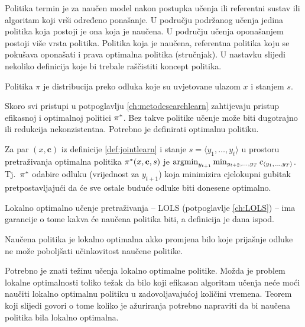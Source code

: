 Politika  termin je za naučen model nakon postupka učenja ili
referentni sustav ili algoritam koji vrši određeno ponašanje. U području
podržanog učenja jedina politika koja postoji je ona koja je naučena. U području
učenja oponašanjem  postoji više vrsta politika. Politika
koja je naučena, referentna politika koju se pokušava oponašati i prava optimalna
politika (stručnjak). U nastavku slijedi nekoliko definicija koje bi trebale
raščistiti koncept politika.

\begin{definition}[Politika]

  Politika $\pi$ je distribucija preko odluka koje su uvjetovane ulazom $x$ i
  stanjem $s$.

\end{definition}

\noindent
Skoro svi pristupi u potpoglavlju \ref{ch:metodesearchlearn} zahtijevaju pristup
efikasnoj i optimalnoj politici $\pi\ssymbol{1}$. Bez takve politike učenje može
biti dugotrajno ili redukcija nekonzistentna. Potrebno je definirati optimalnu
politiku.

\begin{definition}\label{def:optimalpolicy}

  Za par $(x, \mathbf{c})$ iz definicije \ref{def:jointlearn} i stanje $s =
  \langle y_1, \ldots, y_t \rangle$ u prostoru pretraživanja optimalna politika
  $\pi\ssymbol{1}(x, \mathbf{c}, s)$ je $\operatorname*{argmin}_{y_{t+1}} \min_{y_{t+2},
  \ldots, y_T} c_{\langle y_1, \ldots, y_T \rangle}$. Tj.~$\pi\ssymbol{1}$
  odabire odluku (vrijednost za $y_{t+1}$) koja minimizira cjelokupni gubitak
  pretpostavljajući da će sve ostale buduće odluke biti donesene optimalno.

\end{definition}

\noindent
Lokalno optimalno učenje pretraživanja -- \textsc{LOLS} (potpoglavlje
\ref{ch:LOLS}) --  ima garancije o tome kakva će naučena politika biti, a
definicija je dana ispod.

\begin{definition}

  Naučena politika je lokalno optimalna akko promjena bilo koje prijašnje odluke
  ne može poboljšati učinkovitost naučene politike.

\end{definition}

\noindent
Potrebno je znati težinu učenja lokalno optimalne politike. Možda je problem
lokalne optimalnosti toliko težak da bilo koji efikasan algoritam učenja neće
moći naučiti lokalno optimalnu politiku u zadovoljavajućoj količini vremena.
Teorem koji slijedi govori o tome koliko je ažuriranja potrebno napraviti da bi
naučena politika bila lokalno optimalna.

